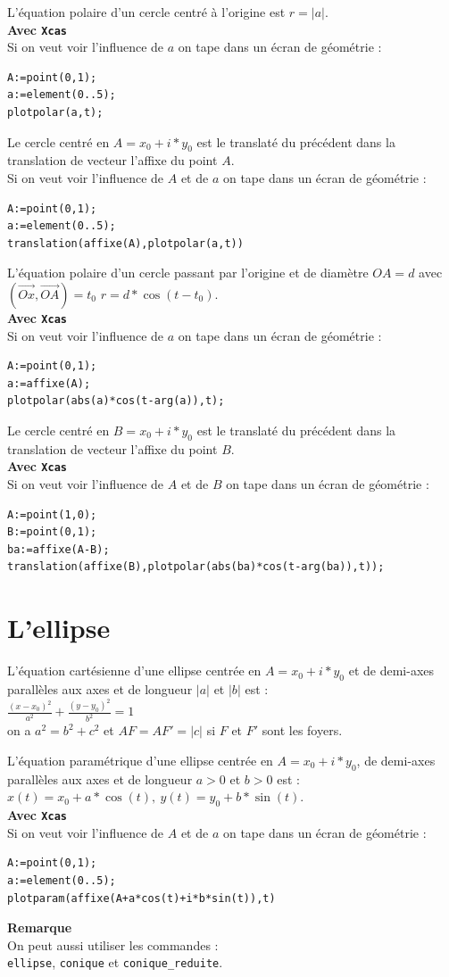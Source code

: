\documentclass[a4paper,11pt]{book}
\begin{document}
L'\'equation polaire d'un cercle centr\'e \`a l'origine est
 $r=|a|$.\\
{\bf Avec {\tt Xcas}}\\
Si on veut voir l'influence de $a$ on tape dans un \'ecran de 
g\'eom\'etrie :
\begin{verbatim}
A:=point(0,1);
a:=element(0..5);
plotpolar(a,t);
\end{verbatim}
Le cercle centr\'e en $A=x_0+i*y_0$  est le translat\'e du pr\'ec\'edent dans 
la translation de vecteur l'affixe du point $A$.\\
Si on veut voir l'influence de $A$ et de $a$ on tape dans un \'ecran de 
g\'eom\'etrie :
\begin{verbatim}
A:=point(0,1);
a:=element(0..5);
translation(affixe(A),plotpolar(a,t))
\end{verbatim}
L'\'equation polaire d'un cercle passant par l'origine et de diam\`etre  $OA=d$
avec $(\overrightarrow{Ox},\overrightarrow{OA})=t_0$
 $r=d*\cos(t-t_0)$.\\
{\bf Avec {\tt Xcas}}\\
Si on veut voir l'influence de $a$ on tape dans un \'ecran de 
g\'eom\'etrie :
\begin{verbatim}
A:=point(0,1);
a:=affixe(A);
plotpolar(abs(a)*cos(t-arg(a)),t);
\end{verbatim}
Le cercle centr\'e en $B=x_0+i*y_0$  est le translat\'e du pr\'ec\'edent dans 
la translation de vecteur l'affixe du point $B$.\\
{\bf Avec {\tt Xcas}}\\
Si on veut voir l'influence de $A$ et de $B$ on tape dans un \'ecran de 
g\'eom\'etrie :
\begin{verbatim}
A:=point(1,0);
B:=point(0,1);
ba:=affixe(A-B);
translation(affixe(B),plotpolar(abs(ba)*cos(t-arg(ba)),t));
\end{verbatim}
\section{L'ellipse}
\noindent L'\'equation cart\'esienne d'une ellipse centr\'ee en $A=x_0+i*y_0$ 
et de demi-axes parall\`eles aux axes et de longueur  $|a|$ et $|b|$  est :\\
 $\displaystyle \frac{(x-x_0)^2}{a^2}+\frac{(y-y_0)^2}{b^2}=1$ \\
on a $a^2=b^2+c^2$ et $AF=AF'=|c|$ si $F$ et $F'$ sont les foyers.

L'\'equation param\'etrique d'une ellipse centr\'ee en $A=x_0+i*y_0$, de 
demi-axes parall\`eles aux axes et de longueur  $a>0$ et $b>0$ est :\\
 $x(t)=x_0+a*\cos(t),\ y(t)=y_0+b*\sin(t)$.\\
{\bf Avec {\tt Xcas}}\\
Si on veut voir l'influence de $A$ et de $a$ on tape dans un \'ecran de 
g\'eom\'etrie :
\begin{verbatim}
A:=point(0,1);
a:=element(0..5);
plotparam(affixe(A+a*cos(t)+i*b*sin(t)),t)
\end{verbatim}
{\bf Remarque}\\
On peut aussi utiliser les commandes :\\
 {\tt ellipse}, {\tt conique} et {\tt conique\_reduite}. 
\end{document}
